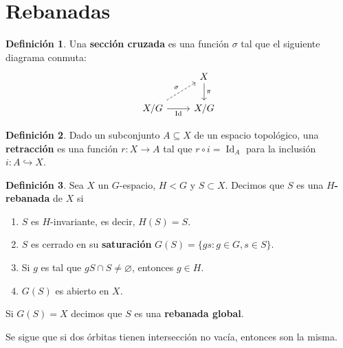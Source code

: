 \documentclass[spanish]{article}
\theoremstyle{definition}
\newtheorem*{defn}{Definición}
\DeclareMathOperator{\Id}{Id}
\begin{document}
\section{Rebanadas}
\begin{defn}
	Una \textbf{sección cruzada} es una función $\sigma$ tal que el siguiente diagrama conmuta:
	\[\begin{tikzcd}
		&X\arrow[d,"\pi"]\\
		X/G\arrow[r,"\Id",swap]\arrow[dashed,ur,"\sigma"]&X/G
	\end{tikzcd}\]
\end{defn}
\begin{defn}
	Dado un subconjunto $A\subseteq X$ de un espacio topológico, una \textbf{retracción} es una función $r:X\to A$ tal que $r\circ i=\Id_A$ para la inclusión $i:A\hookrightarrow X$.
\end{defn}
\begin{defn}
	Sea $X$ un $G$-espacio, $H<G$ y $S\subset X$. Decimos que $S$ es una \textbf{$H$-rebanada} de $X$ si
	\begin{enumerate}
		\item $S$ es $H$-invariante, es decir, $H(S)=S$.
		\item $S$ es cerrado en su \textbf{saturación} $G(S)=\{gs:g\in G,s\in S\}$.
		\item Si $g$ es tal que $gS\cap S\neq\varnothing$, entonces $g\in H$.
		\item $G(S)$ es abierto en $X$.
	\end{enumerate}
	 Si $G(S)=X$ decimos que $S$ es una \textbf{rebanada global}. 
\end{defn}
Se sigue que si dos órbitas tienen intersección no vacía, entonces son la misma.
\end{document}
